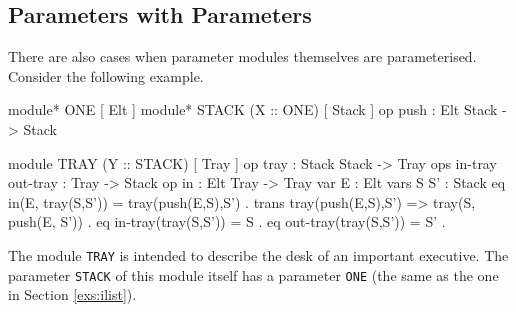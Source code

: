 \documentclass[a4paper]{memoir}
\begin{document}
\subsection{Parameters with Parameters}

There are also cases when parameter modules themselves are parameterised.
Consider the following example.
\begin{vvtm}
\begin{ccode}
  module* ONE { [ Elt ] }
  module* STACK (X :: ONE) {
    [ Stack ]
    op push : Elt Stack -> Stack
  }

  module TRAY (Y :: STACK) {
    [ Tray ]
    op tray : Stack Stack -> Tray
    ops in-tray out-tray : Tray -> Stack
    op in : Elt Tray -> Tray 
    var E : Elt
    vars S S' : Stack
    eq in(E, tray(S,S')) = tray(push(E,S),S') .
    trans tray(push(E,S),S') => tray(S, push(E, S')) .
    eq in-tray(tray(S,S')) = S .
    eq out-tray(tray(S,S')) = S' .
  }
\end{ccode}
\end{vvtm}
The module \verb|TRAY| is intended to describe the desk of an
important executive. The parameter \verb|STACK| of this
module itself has a parameter \verb|ONE| (the same as the one
in Section \ref{exs:ilist}).
\end{document}
